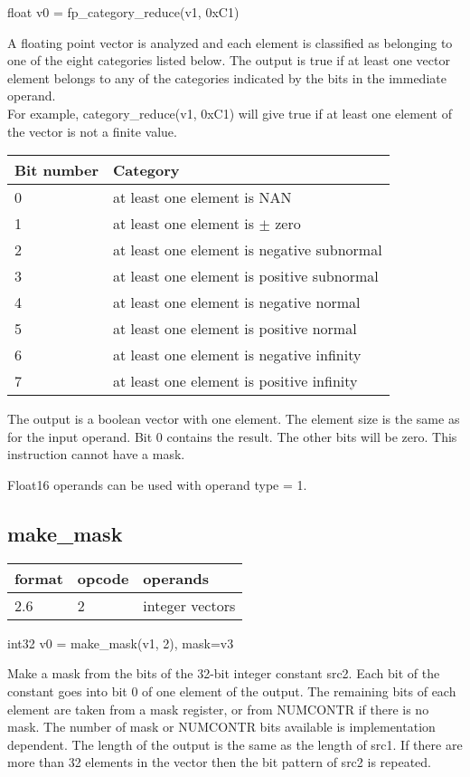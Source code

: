 \documentclass[forwardcom.tex]{subfiles}
\begin{document}
float v0 = fp\_category\_reduce(v1, 0xC1)
\vv

A floating point vector is analyzed and each element is classified as belonging to one of the eight categories listed below. The output is true if at least one vector element belongs to any of the categories indicated by the bits in the immediate operand. \\
For example, category\_reduce(v1, 0xC1) will give true if at least one element of the vector is not a finite value.
\vv

\begin{tabular}{|p{24mm}|p{115mm}|}
\hline
\bfseries Bit number & \bfseries Category \\ \hline
0 & at least one element is NAN \\
1 & at least one element is $\pm$ zero \\
2 & at least one element is negative subnormal \\
3 & at least one element is positive subnormal \\
4 & at least one element is negative normal \\
5 & at least one element is positive normal \\
6 & at least one element is negative infinity \\
7 & at least one element is positive infinity \\
\hline
\end{tabular}
\vv

The output is a boolean vector with one element. The element size is the same as for the input operand. Bit 0 contains the result. The other bits will be zero. 
This instruction cannot have a mask.
\vv

Float16 operands can be used with operand type = 1.
\vv


\subsection{make\_mask}
\label{table:makeMaskInstruction}
\begin{tabular}{|p{12mm}|p{15mm}|p{100mm}|}
\hline
\bfseries format & \bfseries opcode & \bfseries operands \\ \hline
2.6 &  2 & integer vectors \\ \hline
\end{tabular}
\vv

int32 v0 = make\_mask(v1, 2), mask=v3
\vv

Make a mask from the bits of the 32-bit integer constant src2. Each bit of the constant goes into bit 0 of one element of the output. The remaining bits of each element are taken from a mask register, or from NUMCONTR if there is no mask. The number of mask or NUMCONTR bits available is implementation dependent. 
The length of the output is the same as the length of src1. If there are more than 32 elements in the vector then the bit pattern of src2 is repeated.
\vv
\end{document}
